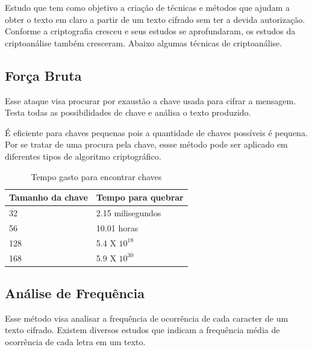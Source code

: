 Estudo que tem como objetivo a criação de técnicas e métodos que ajudam a obter o texto em claro a partir de um texto cifrado sem ter a devida autorização. Conforme a criptografia cresceu e seus estudos se aprofundaram, os estudos da criptoanálise também cresceram. Abaixo algumas técnicas de criptoanálise.

\subsection{Força Bruta}
\label{brute-force}

Esse ataque visa procurar por exaustão a chave usada para cifrar a mensagem. Testa todas as possibilidades de chave e análisa o texto produzido. 

É eficiente para chaves pequenas pois a quantidade de chaves possíveis é pequena. Por se tratar de uma procura pela chave, essse método pode ser aplicado em diferentes tipos de algoritmo criptográfico.

\begin{table}[h]
\centering
	\begin{tabular}{|l|l|}
		\hline
		Tamanho da chave & Tempo para quebrar \\ \hline
		32 & 2.15 milisegundos \\ \hline
		56 & 10.01 horas \\ \hline
		128 & 5.4 X $ 10 ^{18}$ \\ \hline
		168 & 5.9 X $ 10 ^{30}$ \\ \hline
	\end{tabular}
\caption{Tempo gasto para encontrar chaves}
\end{table}

\subsection{Análise de Frequência}
\label{frequency-analysis}

Esse método visa analisar a frequência de ocorrência de cada caracter de um texto cifrado. Existem diversos estudos que indicam a frequência média de ocorrência de cada letra em um texto. 

